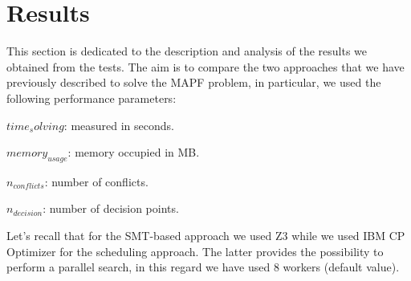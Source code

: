 \documentclass[12pt, a4paper, hidelinks]{article}
\numberwithin{equation}{section}
\begin{document}
\section{Results}\label{sec:results}
This section is dedicated to the description and analysis of the results we obtained from the tests.
The aim is to compare the two approaches that we have previously described to solve the MAPF problem,
in particular, we used the following performance parameters:

\begin{description}
    \item $time_solving$: measured in seconds.
    \item $memory_{usage}$: memory occupied in MB\@.
    \item $n_{conflicts}$: number of conflicts.
    \item $n_{decision}$: number of decision points.
\end{description}

Let's recall that for the SMT-based approach we used Z3 while we used IBM CP Optimizer for the scheduling approach.
The latter provides the possibility to perform a parallel search, in this regard we have used 8 workers (default value).
\end{document}
